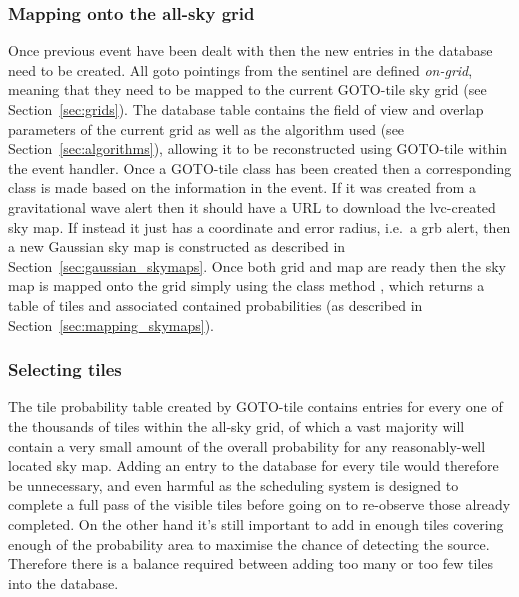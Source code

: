 \begin{colsection}
\begin{colsection}
\subsubsection{Mapping onto the all-sky grid}

Once previous event have been dealt with then the new entries in the database need to be created. All \gls{goto} pointings from the sentinel are defined \textit{on-grid}, meaning that they need to be mapped to the current GOTO-tile sky grid (see Section~\ref{sec:grids}). The database  table contains the field of view and overlap parameters of the current grid as well as the algorithm used (see Section~\ref{sec:algorithms}), allowing it to be reconstructed using GOTO-tile within the event handler. Once a GOTO-tile  class has been created then a corresponding  class is made based on the information in the event. If it was created from a gravitational wave alert then it should have a URL to download the \gls{lvc}-created sky map. If instead it just has a coordinate and error radius, i.e.\ a \gls{grb} alert, then a new Gaussian sky map is constructed as described in Section~\ref{sec:gaussian_skymaps}. Once both grid and map are ready then the sky map is mapped onto the grid simply using the class method , which returns a table of tiles and associated contained probabilities (as described in Section~\ref{sec:mapping_skymaps}). %

\subsubsection{Selecting tiles}

The tile probability table created by GOTO-tile contains entries for every one of the thousands of tiles within the all-sky grid, of which a vast majority will contain a very small amount of the overall probability for any reasonably-well located sky map. Adding an entry to the database for every tile would therefore be unnecessary, and even harmful as the scheduling system is designed to complete a full pass of the visible tiles before going on to re-observe those already completed. On the other hand it's still important to add in enough tiles covering enough of the probability area to maximise the chance of detecting the source. Therefore there is a balance required between adding too many or too few tiles into the database.


\end{colsection}
\end{colsection}
